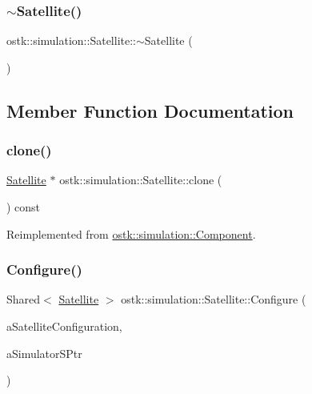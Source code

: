 \subsubsection{\texorpdfstring{$\sim$\+Satellite()}{~Satellite()}}
{\footnotesize\ttfamily ostk\+::simulation\+::\+Satellite\+::$\sim$\+Satellite (\begin{DoxyParamCaption}{ }\end{DoxyParamCaption})}



\subsection{Member Function Documentation}
\mbox{\label{classostk_1_1simulation_1_1_satellite_a9828fe3ec02b8f4d8b2faf8412826f00}} 
\subsubsection{\texorpdfstring{clone()}{clone()}}
{\footnotesize\ttfamily \hyperlink{classostk_1_1simulation_1_1_satellite}{Satellite} $\ast$ ostk\+::simulation\+::\+Satellite\+::clone (\begin{DoxyParamCaption}{ }\end{DoxyParamCaption}) const\hspace{0.3cm}{\ttfamily [virtual]}}



Reimplemented from \hyperlink{classostk_1_1simulation_1_1_component_a36cdd3498146b23e3ff67b95cd1c59cc}{ostk\+::simulation\+::\+Component}.

\mbox{\label{classostk_1_1simulation_1_1_satellite_a8984ad4a21ba686cbae3bbfbb7d5ebb3}} 
\subsubsection{\texorpdfstring{Configure()}{Configure()}}
{\footnotesize\ttfamily Shared$<$ \hyperlink{classostk_1_1simulation_1_1_satellite}{Satellite} $>$ ostk\+::simulation\+::\+Satellite\+::\+Configure (\begin{DoxyParamCaption}\item[{const \hyperlink{structostk_1_1simulation_1_1_satellite_configuration}{Satellite\+Configuration} \&}]{a\+Satellite\+Configuration,  }\item[{const Shared$<$ const \hyperlink{classostk_1_1simulation_1_1_simulator}{Simulator} $>$ \&}]{a\+Simulator\+S\+Ptr }\end{DoxyParamCaption})\hspace{0.3cm}{\ttfamily [static]}}

